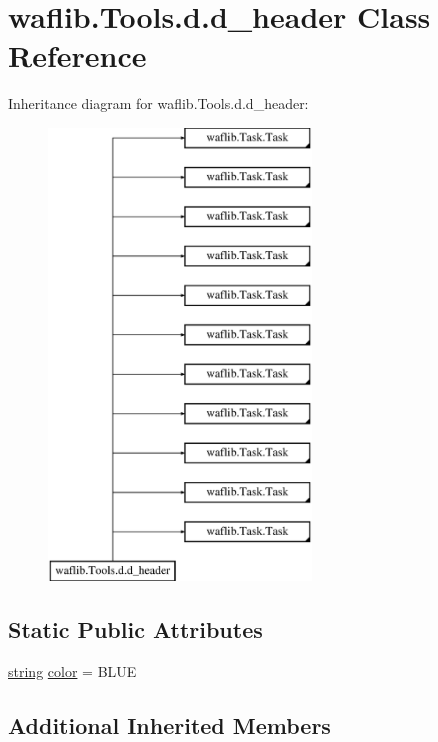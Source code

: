 \hypertarget{classwaflib_1_1_tools_1_1d_1_1d__header}{}\section{waflib.\+Tools.\+d.\+d\+\_\+header Class Reference}
\label{classwaflib_1_1_tools_1_1d_1_1d__header}
Inheritance diagram for waflib.\+Tools.\+d.\+d\+\_\+header\+:\begin{figure}[H]
\begin{center}
\leavevmode
\includegraphics[height=12.000000cm]{classwaflib_1_1_tools_1_1d_1_1d__header}
\end{center}
\end{figure}
\subsection*{Static Public Attributes}
\begin{DoxyCompactItemize}
\item 
\hyperlink{test__lib_f_l_a_c_2format_8c_ab02026ad0de9fb6c1b4233deb0a00c75}{string} \hyperlink{classwaflib_1_1_tools_1_1d_1_1d__header_ae3ae6ab484b020b6e851de770bb8a3b7}{color} = \textquotesingle{}B\+L\+UE\textquotesingle{}
\end{DoxyCompactItemize}
\subsection*{Additional Inherited Members}


